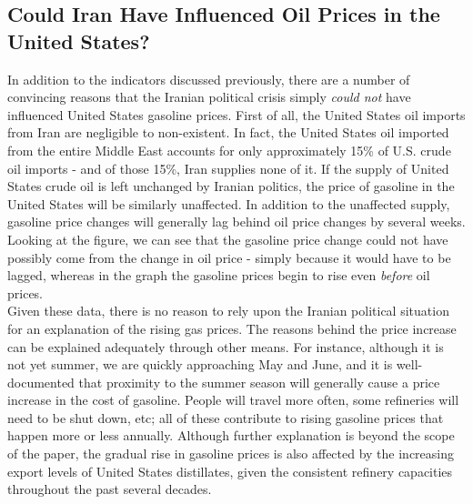 \documentclass[11pt,twocolumn]{article}
\newcommand{\tab}[0] {\hspace*{24pt}}
\begin{document}
\begin{multicols}{2}
\subsection*{Could Iran Have Influenced Oil Prices in the United States?}
In addition to the indicators discussed previously, there are a number of convincing reasons that the Iranian political crisis simply \emph{could not} have influenced United States gasoline prices. First of all, the United States oil imports from Iran are negligible to non-existent. In fact, the United States oil imported from the entire Middle East accounts for only approximately 15\% of U.S. crude oil imports - and of those 15\%, Iran supplies none of it. If the supply of United States crude oil is left unchanged by Iranian politics, the price of gasoline in the United States will be similarly unaffected. In addition to the unaffected supply, gasoline price changes will generally lag behind oil price changes by several weeks. Looking at the figure, we can see that the gasoline price change could not have possibly come from the change in oil price - simply because it would have to be lagged, whereas in the graph the gasoline prices begin to rise even \emph{before} oil prices. \\
\tab Given these data, there is no reason to rely upon the Iranian political situation for an explanation of the rising gas prices. The reasons behind the price increase can be explained adequately through other means. For instance, although it is not yet summer, we are quickly approaching May and June, and it is well-documented that proximity to the summer season will generally cause a price increase in the cost of gasoline. People will travel more often, some refineries will need to be shut down, etc; all of these contribute to rising gasoline prices that happen more or less annually. Although further explanation is beyond the scope of the paper, the gradual rise in gasoline prices is also affected by the increasing export levels of United States distillates, given the consistent refinery capacities throughout the past several decades.


\end{multicols}
\end{document}
